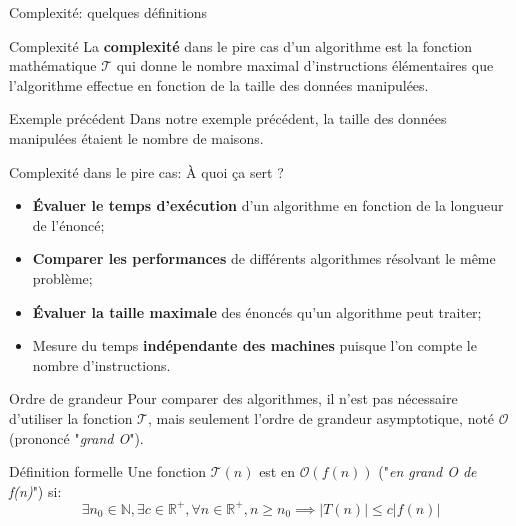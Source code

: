 \documentclass[10pt,xcolor=dvipsnames]{beamer}
\begin{document}
\begin{frame}{Complexité: quelques définitions}

\begin{alertblock}{Complexité}
La \textbf{\alert{complexité}} dans le pire cas d'un algorithme est la fonction mathématique $\mathcal{T}$ qui donne le \alert{nombre maximal d'instructions élémentaires} que l'algorithme effectue en fonction de la taille des données manipulées.\\
\end{alertblock}

\begin{exampleblock}{Exemple précédent}
Dans notre exemple précédent, la taille des données manipulées étaient le nombre de maisons.
\end{exampleblock}
\end{frame}

\begin{frame}{Complexité dans le pire cas: À quoi ça sert ?}
    \begin{itemize}
        \item \alert{\textbf{Évaluer le temps d'exécution}} d'un algorithme en fonction de la longueur de l'énoncé;
        \item \alert{\textbf{Comparer les performances}} de différents algorithmes résolvant le même problème;
        \item \alert{\textbf{Évaluer la taille maximale}} des énoncés qu'un algorithme peut traiter;
        \item Mesure du temps \alert{\textbf{indépendante des machines}} puisque l'on compte le nombre d'instructions.
    \end{itemize}
\end{frame}


\begin{frame}{Ordre de grandeur}
Pour comparer des algorithmes, il n'est pas nécessaire d'utiliser la fonction $\mathcal{T}$, mais seulement l'ordre de grandeur asymptotique, noté $\mathcal{O}$ (prononcé "\textit{grand O}").

\begin{alertblock}{Définition formelle}
Une fonction $\mathcal{T}(n)$ est en $\mathcal{O}(f(n))$ ("\textit{en grand O de f(n)}") si:
\begin{equation*}
    \exists n_0 \in \mathbb{N}, \exists c \in \mathbb{R}^+, \forall n \in \mathbb{R}^+, n \geq n_0 \implies | T(n) | \leq c | f(n) | 
\end{equation*}
\end{alertblock}


\end{frame}
\end{document}
